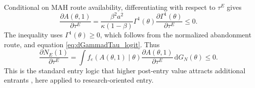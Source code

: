\documentclass[12pt]{article}
\newcommand{\1}{\mathbf{1}}
\newcommand{\dd}{\mathrm{d}}
\begin{document}
Conditional on MAH route availability, differentiating with respect to $\tau^E$ gives
\begin{equation}
    \frac{\partial A(\theta,1)}{\partial \tau^E}
    =
    \frac{\beta^2 a^2}{\kappa(1-\beta)}
    \Gamma^1(\theta)
    \frac{\partial\Gamma^1(\theta)}{\partial\tau^E}
    \le0.
    \label{eq:dAdtau}
\end{equation}
The inequality uses $\Gamma^1(\theta)\ge0$, which follows from the normalized abandonment route, and equation \eqref{eq:dGammadTau_logit}.
Thus
\begin{equation}
    \frac{\partial N_E(1)}{\partial \tau^E}
    =
    \int
    f_e\!\left(A(\theta,1)\mid\theta\right)
    \frac{\partial A(\theta,1)}{\partial\tau^E}
    \,\dd G_N(\theta)
    \le0.
    \label{eq:dEntrydtau}
\end{equation}
This is the standard entry logic that higher post-entry value attracts additional entrants \citep{BresnahanReiss1991,Berry1992}, here applied to research-oriented entry.
\end{document}
